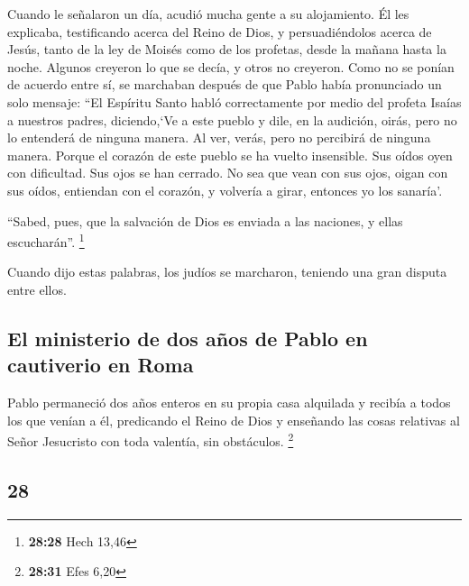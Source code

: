 \begin{paracol}{2}
 Cuando le señalaron un día, acudió mucha gente a su
alojamiento. Él les explicaba, testificando acerca del Reino de Dios, y
persuadiéndolos acerca de Jesús, tanto de la ley de Moisés como de los
profetas, desde la mañana hasta la noche.  Algunos
creyeron lo que se decía, y otros no creyeron.  Como no
se ponían de acuerdo entre sí, se marchaban después de que Pablo había
pronunciado un solo mensaje: ``El Espíritu Santo habló correctamente por
medio del profeta Isaías a nuestros padres,  diciendo,`Ve
a este pueblo y dile, en la audición, oirás, pero no lo entenderá de
ninguna manera. Al ver, verás, pero no percibirá de ninguna manera.
 Porque el corazón de este pueblo se ha vuelto
insensible. Sus oídos oyen con dificultad. Sus ojos se han cerrado. No
sea que vean con sus ojos, oigan con sus oídos, entiendan con el
corazón, y volvería a girar, entonces yo los sanaría'.

 ``Sabed, pues, que la salvación de Dios es enviada a las
naciones, y ellas escucharán''. \footnote{\textbf{28:28} Hech 13,46}

 Cuando dijo estas palabras, los judíos se marcharon,
teniendo una gran disputa entre ellos.

\hypertarget{el-ministerio-de-dos-auxf1os-de-pablo-en-cautiverio-en-roma}{%
\subsection{El ministerio de dos años de Pablo en cautiverio en
Roma}\label{el-ministerio-de-dos-auxf1os-de-pablo-en-cautiverio-en-roma}}

 Pablo permaneció dos años enteros en su propia casa
alquilada y recibía a todos los que venían a él, 
predicando el Reino de Dios y enseñando las cosas relativas al Señor
Jesucristo con toda valentía, sin obstáculos. \footnote{\textbf{28:31}
  Efes 6,20} \switchcolumn \begin{otherlanguage}{english}

\hypertarget{section-55}{%
\section{28}\label{section-55}}


\end{otherlanguage}
\end{paracol}
